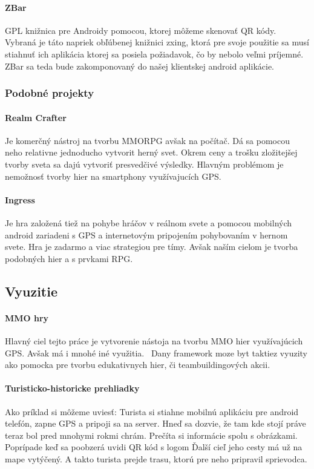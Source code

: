 \paragraph{ZBar} GPL knižnica pre Androidy pomocou, ktorej môžeme skenovať QR kódy. Vybraná je táto napriek obľúbenej knižnici zxing, ktorá pre svoje použitie sa musí stiahnuť ich aplikácia ktorej sa posiela požiadavok, čo by nebolo veľmi príjemné. ZBar sa teda bude zakomponovaný do našej klientskej android aplikácie.


\subsubsection{Podobné projekty}

\paragraph{Realm Crafter} Je komerčný nástroj na tvorbu MMORPG avšak na počítač. Dá sa pomocou neho relativne jednoducho vytvorit herný svet. Okrem ceny a trošku zložitejšej tvorby sveta sa dajú vytvoriť presvedčivé výsledky. Hlavným problémom je nemožnosť tvorby hier na smartphony využívajucích GPS.

\paragraph{Ingress} Je hra založená tiež na pohybe hráčov v reálnom svete a pomocou mobilných android zariadeni s GPS a internetovým pripojením pohybovaním v hernom svete. Hra je zadarmo a viac strategiou pre tímy. Avšak naším cielom je tvorba podobných hier a s prvkami RPG.


\subsection{Vyuzitie}
\paragraph{MMO hry}
Hlavný ciel tejto práce je vytvorenie nástoja na tvorbu MMO hier využívajúcich GPS.
Avšak má i mnohé iné využitia. \
Dany framework moze byt taktiez vyuzity ako pomocka pre tvorbu edukativnych hier, či teambuildingových akcii.

\paragraph{Turisticko-historicke prehliadky}
Ako príklad si môžeme uviesť: Turista si stiahne mobilnú aplikáciu pre android telefón, zapne GPS a pripoji sa na server. Hneď sa dozvie, že tam kde stojí práve teraz bol pred mnohymi rokmi chrám. Prečíta si informácie spolu s obrázkami. Poprípade keď sa poobzerá uvidi QR kód s logom Ďalší cieľ jeho cesty má už na mape vytýčený. A takto turista prejde trasu, ktorú pre neho pripravil sprievodca. 
